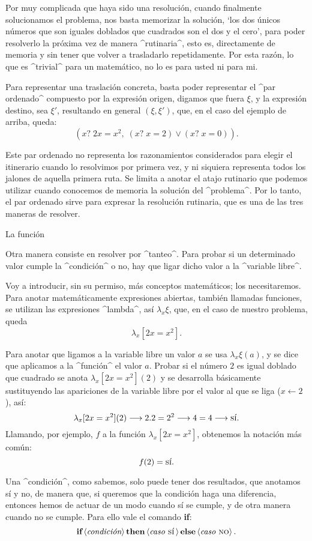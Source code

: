Por muy complicada que haya sido una resolución, cuando finalmente
solucionamos el problema, nos basta memorizar la solución, `los dos
únicos números que son iguales doblados que cuadrados son el dos y el
cero', para poder resolverlo la próxima vez de manera ^rutinaria^, esto
es, directamente de memoria y sin tener que volver a trasladarlo
repetidamente. Por esta razón, lo que es ^trivial^ para un matemático,
no lo es para usted ni para mi.

Para representar una traslación concreta, basta poder representar el
^par ordenado^ compuesto por la expresión origen, digamos que fuera
$\xi$, y la expresión destino, sea $\xi'$, resultando en general
$(\xi,\xi')$, que, en el caso del ejemplo de arriba, queda:
$$\left( x?\; 2x=x^2,\; (x?\; x=2) \lor (x?\; x=0) \right) .$$

Este par ordenado no representa los razonamientos considerados para
elegir el itinerario cuando lo resolvimos por primera vez, y ni siquiera
representa todos los jalones de aquella primera ruta. Se limita a anotar
el atajo rutinario que podemos utilizar cuando conocemos de memoria la
solución del ^problema^. Por lo tanto, el par ordenado sirve para
expresar la resolución rutinaria, que es una de las tres maneras de
resolver.


\Section La función

Otra manera consiste en resolver por ^tanteo^. Para probar si un
determinado valor cumple la ^condición^ o no, hay que ligar dicho valor
a la ^variable libre^.

Voy a introducir, sin su permiso, más conceptos matemáticos; los
necesitaremos. Para anotar matemáticamente expresiones abiertas, también
llamadas funciones, se utilizan las expresiones ^lambda^, así $\lambda_x
\xi$, que, en el caso de nuestro problema, queda
 $$\lambda_x [2x=x^2].$$

Para anotar que ligamos a la variable libre un valor $a$ se usa
$\lambda_x \xi(a)$, y se dice que aplicamos a la ^función^ el valor $a$.
Probar si el número $2$ es igual doblado que cuadrado se anota
$\lambda_x [2x=x^2](2)$ y se desarrolla básicamente sustituyendo las
apariciones de la variable libre por el valor al que se liga ($x
\gets 2$), así:
$$\lambda_x [2x=x^2](2) \longrightarrow 2.2 = 2^2 \longrightarrow 4 = 4
 \longrightarrow \hbox{\sc sí} .$$
Llamando, por ejemplo, $f$ a la función $\lambda_x [2x=x^2]$, obtenemos
la notación más común: $$f(2) = \hbox{\sc sí} .$$

Una ^condición^, como sabemos, solo puede tener dos resultados, que
anotamos {\sc sí} y {\sc no}, de manera que, si queremos que la
condición haga una diferencia, entonces hemos de actuar de un modo
cuando {\sc sí} se cumple, y de otra manera cuando {\sc no} se cumple.
Para ello vale el comando {\bf if}:
$$\hbox{\bf if} \left< \hbox{\it condición} \right>
  \hbox{\bf then} \left< \hbox{\it caso \sc sí}\, \right>
  \hbox{\bf else} \left< \hbox{\it caso \sc no} \right> .$$

